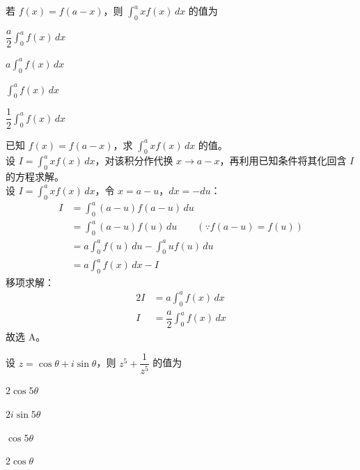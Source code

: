 \documentclass[12pt,a4paper]{exam-zh}
\begin{document}
\begin{question}
    若 $f(x)=f(a-x)$，则 $\displaystyle\int_0^a xf(x)\,dx$ 的值为 \paren[A]
    \begin{choices}
        \item $\dfrac{a}{2}\displaystyle\int_0^a f(x)\,dx$
        \item $a\displaystyle\int_0^a f(x)\,dx$
        \item $\displaystyle\int_0^a f(x)\,dx$
        \item $\dfrac{1}{2}\displaystyle\int_0^a f(x)\,dx$
    \end{choices}
\end{question}

\begin{solution}
    已知 $f(x)=f(a-x)$，求 $\displaystyle\int_0^a xf(x)\,dx$ 的值。\\
    设 $I=\displaystyle\int_0^a xf(x)\,dx$，对该积分作代换 $x\to a-x$，再利用已知条件将其化回含 $I$ 的方程求解。\\
    设 $I=\displaystyle\int_0^a xf(x)\,dx$，令 $x=a-u$，$dx=-du$：
    \begin{align*}
        I &= \int_0^a (a-u)f(a-u)\,du \\
        &= \int_0^a (a-u)f(u)\,du \qquad (\because f(a-u)=f(u)) \\
        &= a\int_0^a f(u)\,du - \int_0^a uf(u)\,du \\
        &= a\int_0^a f(x)\,dx - I
    \end{align*}
    移项求解：
    \begin{align*}
        2I &= a\int_0^a f(x)\,dx \\
        I &= \dfrac{a}{2}\int_0^a f(x)\,dx
    \end{align*}
    故选 A。
\end{solution}

\begin{question}
    设 $z=\cos\theta+i\sin\theta$，则 $z^5+\dfrac{1}{z^5}$ 的值为 \paren[A]
    \begin{choices}
        \item $2\cos5\theta$
        \item $2i\sin5\theta$
        \item $\cos5\theta$
        \item $2\cos\theta$
    \end{choices}
\end{question}
\end{document}
